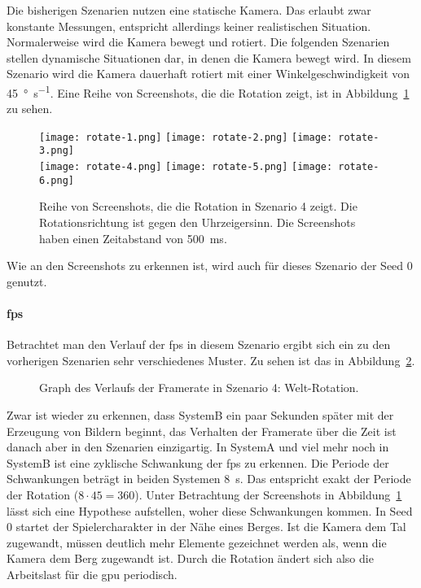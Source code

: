 Die bisherigen Szenarien nutzen eine statische Kamera. Das erlaubt zwar konstante Messungen, entspricht allerdings keiner realistischen Situation. Normalerweise wird die Kamera bewegt und rotiert. Die folgenden Szenarien stellen dynamische Situationen dar, in denen die Kamera bewegt wird. In diesem Szenario wird die Kamera dauerhaft rotiert mit einer Winkelgeschwindigkeit von \SI{45}{\degree\per\second}. Eine Reihe von Screenshots, die die Rotation zeigt, ist in Abbildung~\ref{fig:rotate} zu sehen.
\begin{figure}
	\centering
	\texttt{[image: rotate-1.png]}
	\texttt{[image: rotate-2.png]}
	\texttt{[image: rotate-3.png]}\\[4pt]
	\texttt{[image: rotate-4.png]}
	\texttt{[image: rotate-5.png]}
	\texttt{[image: rotate-6.png]}
	\caption{Reihe von Screenshots, die die Rotation in Szenario 4 zeigt. Die Rotationsrichtung ist gegen den Uhrzeigersinn. Die Screenshots haben einen Zeitabstand von \SI{500}{\milli\second}.}\label{fig:rotate}
\end{figure}
Wie an den Screenshots zu erkennen ist, wird auch für dieses Szenario der Seed 0 genutzt.

\paragraph{\ac{fps}}
Betrachtet man den Verlauf der \ac{fps} in diesem Szenario ergibt sich ein zu den vorherigen Szenarien sehr verschiedenes Muster. Zu sehen ist das in Abbildung~\ref{fig:seed-0-rotate-fps}.
\begin{figure}[!htbp]
	\caption{Graph des Verlaufs der Framerate in Szenario 4: Welt-Rotation.}\label{fig:seed-0-rotate-fps}
\end{figure}
 Zwar ist wieder zu erkennen, dass SystemB ein paar Sekunden später mit der Erzeugung von Bildern beginnt, das Verhalten der Framerate über die Zeit ist danach aber in den Szenarien einzigartig. In SystemA und viel mehr noch in SystemB ist eine zyklische Schwankung der \ac{fps} zu erkennen. Die Periode der Schwankungen beträgt in beiden Systemen \SI{8}{\second}. Das entspricht exakt der Periode der Rotation ($8\cdot45 = 360$). Unter Betrachtung der Screenshots in Abbildung~\ref{fig:rotate} lässt sich eine Hypothese aufstellen, woher diese Schwankungen kommen. In Seed 0 startet der Spielercharakter in der Nähe eines Berges. Ist die Kamera dem Tal zugewandt, müssen deutlich mehr Elemente gezeichnet werden als, wenn die Kamera dem Berg zugewandt ist. Durch die Rotation ändert sich also die Arbeitslast für die \ac{gpu} periodisch.

